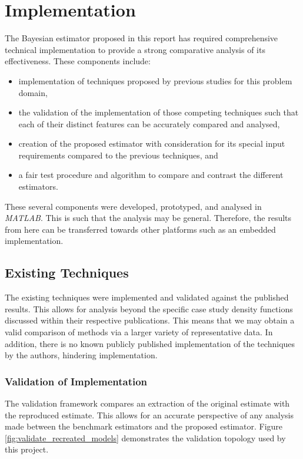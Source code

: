 \chapter{Implementation}\label{C:implementation}
The Bayesian estimator proposed in this report has required comprehensive technical implementation to provide a strong comparative analysis of its effectiveness. These components include:

\begin{itemize}
    \item implementation of techniques proposed by previous studies for this problem domain,
    \item the validation of the implementation of those competing techniques such that each of their distinct features can be accurately compared and analysed,
    \item creation of the proposed estimator with consideration for its special input requirements compared to the previous techniques, and
    \item a fair test procedure and algorithm to compare and contrast the different estimators.
\end{itemize}

These several components were developed, prototyped, and analysed in \textit{MATLAB}. This is such that the analysis may be general. Therefore, the results from here can be transferred towards other platforms such as an embedded implementation.



\section{Existing Techniques}
The existing techniques were implemented and validated against the published results. This allows for analysis beyond the specific case study density functions discussed within their respective publications. This means that we may obtain a valid comparison of methods via a larger variety of representative data. In addition, there is no known publicly published implementation of the techniques by the authors, hindering implementation.

\subsection{Validation of Implementation}
The validation framework compares an extraction of the original estimate with the reproduced estimate. This allows for an accurate perspective of any analysis made between the benchmark estimators and the proposed estimator. Figure \ref{fig:validate_recreated_models} demonstrates the validation topology used by this project.

